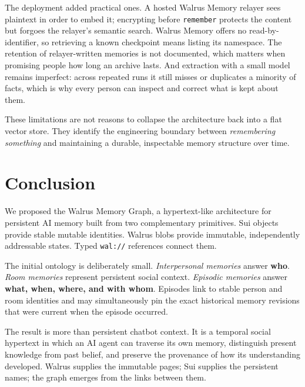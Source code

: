\documentclass[11pt]{article}
\begin{document}
The deployment added practical ones. A hosted Walrus Memory relayer sees plaintext in order to embed it; encrypting before \texttt{remember} protects the content but forgoes the relayer's semantic search. Walrus Memory offers no read-by-identifier, so retrieving a known checkpoint means listing its namespace. The retention of relayer-written memories is not documented, which matters when promising people how long an archive lasts. And extraction with a small model remains imperfect: across repeated runs it still misses or duplicates a minority of facts, which is why every person can inspect and correct what is kept about them.

These limitations are not reasons to collapse the architecture back into a flat vector store. They identify the engineering boundary between \emph{remembering something} and maintaining a durable, inspectable memory structure over time.

\section{Conclusion}

We proposed the Walrus Memory Graph, a hypertext-like architecture for persistent AI memory built from two complementary primitives. Sui objects provide stable mutable identities. Walrus blobs provide immutable, independently addressable states. Typed \texttt{wal://} references connect them.

The initial ontology is deliberately small. \emph{Interpersonal memories} answer \textbf{who}. \emph{Room memories} represent persistent social context. \emph{Episodic memories} answer \textbf{what, when, where, and with whom}. Episodes link to stable person and room identities and may simultaneously pin the exact historical memory revisions that were current when the episode occurred.

The result is more than persistent chatbot context. It is a temporal social hypertext in which an AI agent can traverse its own memory, distinguish present knowledge from past belief, and preserve the provenance of how its understanding developed. Walrus supplies the immutable pages; Sui supplies the persistent names; the graph emerges from the links between them.
\end{document}
